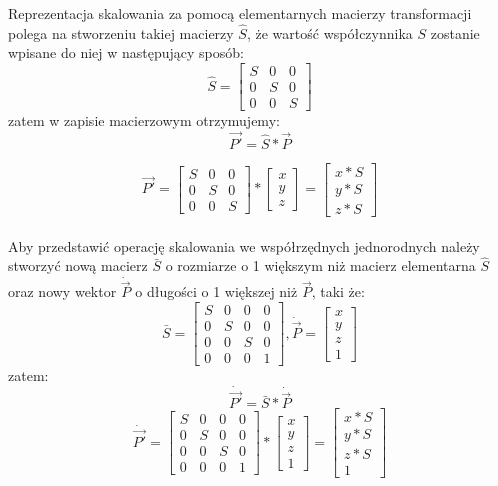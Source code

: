 \documentclass[licencjacka]{pracamgr}
\begin{document}
Reprezentacja skalowania za pomocą elementarnych macierzy transformacji polega na stworzeniu takiej macierzy $\hat{S}$, że wartość współczynnika $S$ zostanie wpisane do niej w następujący sposób:
$$
\hat{S}
=
\begin{bmatrix}
S & 0 & 0 \\
0 & S & 0 \\
0 & 0 & S
\end{bmatrix}
$$
zatem w zapisie macierzowym otrzymujemy:
$$
\vec{P'}=\hat{S}*\vec{P}
$$

$$
\vec{P'}
=
\begin{bmatrix}
S & 0 & 0 \\
0 & S & 0 \\
0 & 0 & S
\end{bmatrix}
*
\begin{bmatrix} 
x \\ 
y \\ 
z 
\end{bmatrix} 
=
\begin{bmatrix} 
x*S \\ 
y*S \\ 
z*S 
\end{bmatrix}
$$
\\
Aby przedstawić operację skalowania we współrzędnych jednorodnych należy stworzyć nową macierz $\bar{S}$ o rozmiarze o 1 większym niż macierz elementarna $\hat{S}$ oraz nowy wektor $\dot{\vec{P}}$ o długości o 1 większej niż $\vec{P}$, taki że:
$$
\bar{S} 
= 
\begin{bmatrix}
S & 0 & 0 & 0 \\
0 & S & 0 & 0 \\
0 & 0 & S & 0 \\
0 & 0 & 0 & 1
\end{bmatrix}
,  
\dot{\vec{P}}
=
\begin{bmatrix} 
x \\ 
y \\ 
z \\
1
\end{bmatrix} 
$$
zatem:
$$
\dot{\vec{P'}}=\bar{S}*\dot{\vec{P}}
$$
$$
\dot{\vec{P'}} = 
\begin{bmatrix}
S & 0 & 0 & 0 \\
0 & S & 0 & 0 \\
0 & 0 & S & 0 \\
0 & 0 & 0 & 1
\end{bmatrix}
*
\begin{bmatrix} 
x \\ 
y \\ 
z \\
1
\end{bmatrix} 
=
\begin{bmatrix} 
x*S \\ 
y*S \\ 
z*S \\
1
\end{bmatrix}
$$
\end{document}
